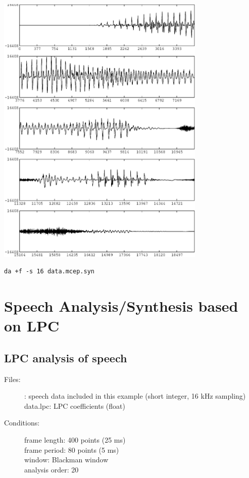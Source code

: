 \documentclass[a4paper,10pt]{article}
\begin{document}
\includegraphics[width=10cm]{eps/data.mcep.syn.gwave.eps}

\begin{verbatim}
da +f -s 16 data.mcep.syn
\end{verbatim}

\section{Speech Analysis/Synthesis based on LPC}

\subsection{LPC analysis of speech}

\begin{description}
\item[Files:]
  : speech data included in this example (short integer, 16 kHz sampling)\\
  data.lpc: LPC coefficients (float)
\item[Conditions:]
  frame length: 400 points (25 ms)\\
  frame period: 80 points (5 ms)\\
  window: Blackman window\\
  analysis order: 20
\end{description}
\end{document}
